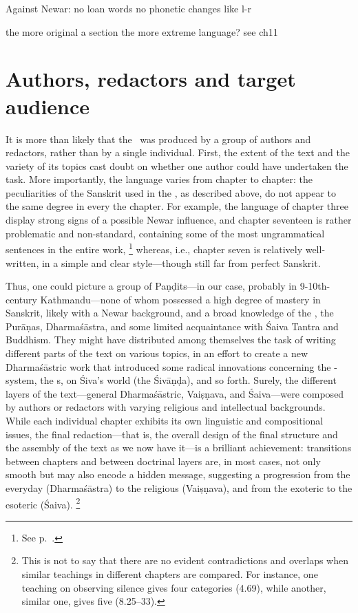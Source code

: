 Against Newar: no loan words no phonetic changes like l-r

\CHECK the more original a section the more extreme language? see ch11



\section{Authors, redactors and target audience}

It is more than likely that the \VSS\ was produced by a group 
of authors and redactors, rather than by a single individual. 
First, the extent of the text and the variety of its topics
cast doubt on whether one author could have undertaken the task.
More importantly, the language varies from chapter to chapter:
the peculiarities of the Sanskrit used in the \VSS, as described above,
do not appear to the same degree in every the chapter. 
For example, the language of chapter three display strong signs
of a possible Newar influence, and
chapter seventeen is rather problematic and non-standard,
containing some of the most ungrammatical sentences in the entire work,%
               \footnote{See p.~\pageref{extremelanguage}.}
whereas, i.e., chapter seven is relatively well-written, in a simple and 
clear style---though still far from perfect Sanskrit.

        Thus, one could picture a group of Paṇḍits---in our case, probably in 
9-10th-century Kathmandu---none of whom possessed a high degree of mastery
in Sanskrit, likely with a Newar background, and a broad knowledge
of the \MBh, the Purāṇas, Dharmaśāstra, and some limited acquaintance
with Śaiva Tantra and Buddhism.
        They might have distributed among themselves the task of writing different 
parts of the text on various topics, in an effort to create 
a new Dharmaśāstric work that introduced some radical innovations concerning the
-system, the s, on Śiva's world (the Śivāṇḍa), and so forth.
Surely, the different layers of the text---general Dharmaśāstric, Vaiṣṇava,
and Śaiva---were composed by authors or redactors with varying
religious and intellectual backgrounds. 
        While each individual chapter exhibits its own linguistic and compositional issues,
the final redaction---that is, the overall design of the final structure and
the assembly of the text as we now have it---is a brilliant achievement:
transitions between chapters and between doctrinal layers
are, in most cases, not only smooth but may also
encode a hidden message, suggesting a progression from the 
everyday (Dharmaśāstra) to the religious (Vaiṣṇava), 
and from the exoteric to the esoteric (Śaiva).%
        \footnote{This is not to say that there are no evident
                  contradictions and overlaps when similar teachings in different
                  chapters are compared. For instance, one teaching
                  on observing silence  gives four categories
                  (4.69), while another, similar one, gives five (8.25--33).}

